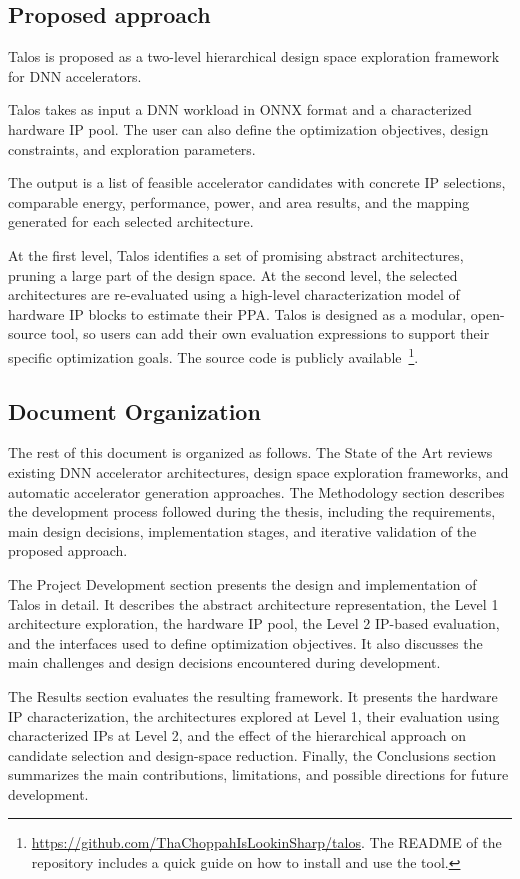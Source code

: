 \subsection{Proposed approach}

Talos is proposed as a two-level hierarchical design space exploration
framework for DNN accelerators.

Talos takes as input a DNN workload in ONNX format and a characterized
hardware IP pool. The user can also define the optimization
objectives, design constraints, and exploration parameters.

The output is a list of feasible accelerator candidates with concrete
IP selections, comparable energy, performance, power, and area
results, and the mapping generated for each selected
architecture.

At the first level, Talos identifies a set of promising
abstract architectures, pruning a large part of the design
space. At the second level, the selected architectures are
re-evaluated using a high-level characterization model of hardware IP
blocks to estimate their PPA.
Talos is designed as a modular, open-source tool, so users can add
their own evaluation expressions to support their specific
optimization goals. The source code is publicly
available~\cite{talos_repo}\footnote{\url{https://github.com/ThaChoppahIsLookinSharp/talos}.
The README of the repository includes a quick guide on how to install
and use the tool.}.

\subsection{Document Organization}
The rest of this document is organized as follows. The State of the
Art reviews existing DNN accelerator architectures, design space
exploration frameworks, and automatic accelerator generation
approaches. The Methodology section describes the development process
followed during the thesis, including the requirements, main design
decisions, implementation stages, and iterative validation of the
proposed approach.

The Project Development section presents the design and implementation
of Talos in detail. It describes the abstract architecture
representation, the Level 1 architecture exploration, the hardware IP
pool, the Level 2 IP-based evaluation, and the interfaces used to
define optimization objectives. It also discusses the main challenges
and design decisions encountered during development.

The Results section evaluates the resulting framework. It presents the
hardware IP characterization, the architectures explored at Level 1,
their evaluation using characterized IPs at Level 2, and the effect of
the hierarchical approach on candidate selection and design-space
reduction. Finally, the Conclusions section summarizes the main
contributions, limitations, and possible directions for future
development.
